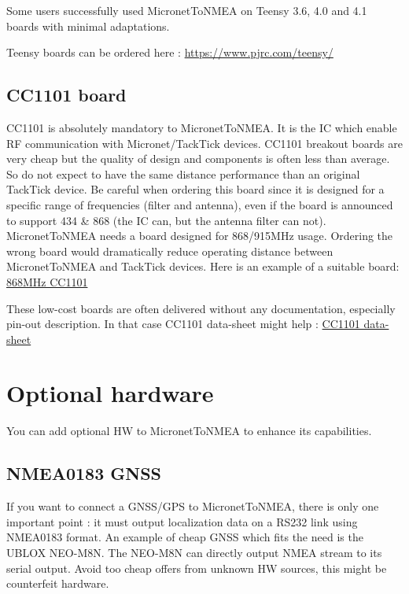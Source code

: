 \documentclass{report}
\begin{document}
Some users successfully used MicronetToNMEA on Teensy 3.6, 4.0 and 4.1 boards with minimal adaptations.

Teensy boards can be ordered here : \url{https://www.pjrc.com/teensy/}

\subsection{CC1101 board}

CC1101 is absolutely mandatory to MicronetToNMEA. It is the IC which enable RF communication with Micronet/TackTick devices. CC1101 breakout boards are very cheap but the quality of design and components is often less than average. So do not expect to have the same distance performance than an original TackTick device. Be careful when ordering this board since it is designed for a specific range of frequencies (filter and antenna), even if the board is announced to support 434 \& 868 (the IC can, but the antenna filter can not). MicronetToNMEA needs a board designed for 868/915MHz usage. Ordering the wrong board would dramatically reduce operating distance between MicronetToNMEA and TackTick devices. Here is an example of a suitable board: \href{https://www.amazon.fr/laqiya-cc1101-868-MHz-Transmission-Antenne-Transceiver/dp/B075PFQ57G}{868MHz CC1101}

These low-cost boards are often delivered without any documentation, especially pin-out description. In that case CC1101 data-sheet might help : \href{https://www.ti.com/lit/ds/symlink/cc1101.pdf}{CC1101 data-sheet}

\section{Optional hardware}

You can add optional HW to MicronetToNMEA to enhance its capabilities.

\subsection{NMEA0183 GNSS}

If you want to connect a GNSS/GPS to MicronetToNMEA, there is only one important point : it must output localization data on a RS232 link using NMEA0183 format. An example of cheap GNSS which fits the need is the UBLOX NEO-M8N. The NEO-M8N can directly output NMEA stream to its serial output. Avoid too cheap offers from unknown HW sources, this might be counterfeit hardware.
\end{document}
